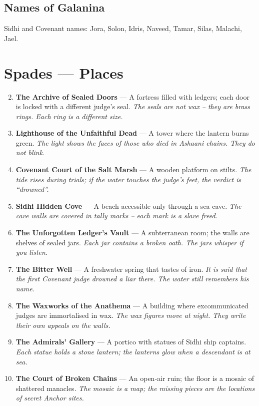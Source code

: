 \documentclass[11pt]{book}
\begin{document}
\subsection*{Names of Galanina}
Sidhi and Covenant names: Jora, Solon, Idris, Naveed, Tamar, Silas, Malachi, Jael.

\section*{Spades — Places}
\begin{enumerate}
\setcounter{enumi}{1}
\item \textbf{The Archive of Sealed Doors} — A fortress filled with ledgers; each door is locked with a different judge’s seal. \textit{The seals are not wax – they are brass rings. Each ring is a different size.}
\item \textbf{Lighthouse of the Unfaithful Dead} — A tower where the lantern burns green. \textit{The light shows the faces of those who died in Ashaani chains. They do not blink.}
\item \textbf{Covenant Court of the Salt Marsh} — A wooden platform on stilts. \textit{The tide rises during trials; if the water touches the judge’s feet, the verdict is “drowned”.}
\item \textbf{Sidhi Hidden Cove} — A beach accessible only through a sea‑cave. \textit{The cave walls are covered in tally marks – each mark is a slave freed.}
\item \textbf{The Unforgotten Ledger’s Vault} — A subterranean room; the walls are shelves of sealed jars. \textit{Each jar contains a broken oath. The jars whisper if you listen.}
\item \textbf{The Bitter Well} — A freshwater spring that tastes of iron. \textit{It is said that the first Covenant judge drowned a liar there. The water still remembers his name.}
\item \textbf{The Waxworks of the Anathema} — A building where excommunicated judges are immortalised in wax. \textit{The wax figures move at night. They write their own appeals on the walls.}
\item \textbf{The Admirals’ Gallery} — A portico with statues of Sidhi ship captains. \textit{Each statue holds a stone lantern; the lanterns glow when a descendant is at sea.}
\item \textbf{The Court of Broken Chains} — An open‑air ruin; the floor is a mosaic of shattered manacles. \textit{The mosaic is a map; the missing pieces are the locations of secret Anchor sites.}

\end{enumerate}
\end{document}
